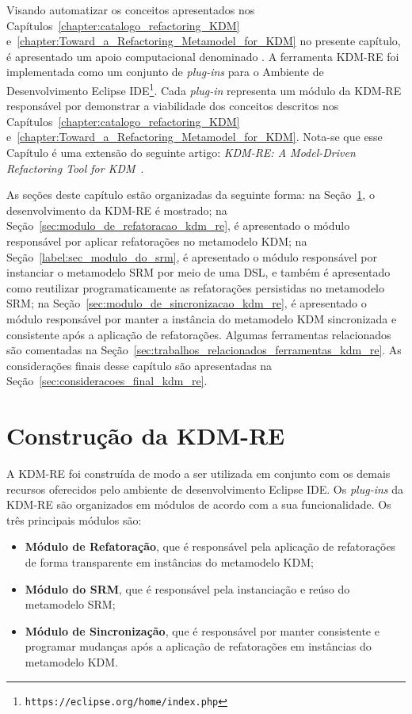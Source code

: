 Visando automatizar os conceitos apresentados nos Capítulos~\ref{chapter:catalogo_refactoring_KDM} e~\ref{chapter:Toward_a_Refactoring_Metamodel_for_KDM} no presente capítulo, é apresentado um apoio computacional denominado . A ferramenta KDM-RE foi implementada como um conjunto de \textit{plug-ins} para o Ambiente de Desenvolvimento Eclipse IDE\footnote{\texttt{https://eclipse.org/home/index.php}}. Cada \textit{plug-in} representa um módulo da KDM-RE responsável por demonstrar a viabilidade dos conceitos descritos nos Capítulos~\ref{chapter:catalogo_refactoring_KDM} e~\ref{chapter:Toward_a_Refactoring_Metamodel_for_KDM}.  Nota-se que esse Capítulo é uma extensão do seguinte artigo: \textit{KDM-RE: A Model-Driven Refactoring Tool for KDM}~\cite{durelli_VEM_ferramenta}.


As seções deste capítulo estão organizadas da seguinte forma: na Seção~\ref{sec:construcao_da_kdm_re}, o desenvolvimento da KDM-RE é mostrado; na Seção~\ref{sec:modulo_de_refatoracao_kdm_re}, é apresentado o módulo responsável por aplicar refatorações no metamodelo KDM; na Seção~\ref{label:sec_modulo_do_srm}, é apresentado o módulo responsável por instanciar o metamodelo SRM por meio de uma DSL, e também é apresentado como reutilizar programaticamente as refatorações persistidas no metamodelo SRM; na Seção~\ref{sec:modulo_de_sincronizacao_kdm_re}, é apresentado o módulo responsável por manter a instância do metamodelo KDM sincronizada e consistente após a aplicação de refatorações. Algumas ferramentas relacionados são comentadas na Seção~\ref{sec:trabalhos_relacionados_ferramentas_kdm_re}. As considerações finais desse capítulo são apresentadas na Seção~\ref{sec:consideracoes_final_kdm_re}.

\section{Construção da KDM-RE}\label{sec:construcao_da_kdm_re}

A KDM-RE foi construída de modo a ser utilizada em conjunto com os demais recursos oferecidos pelo ambiente de desenvolvimento Eclipse IDE. Os \textit{plug-ins} da KDM-RE são organizados em módulos de acordo com a sua funcionalidade. Os três principais módulos são:

\begin{itemize}
\item \textbf{Módulo de Refatoração}, que é responsável pela aplicação de refatorações de forma transparente em instâncias do metamodelo KDM;

\item \textbf{Módulo do SRM}, que é responsável pela instanciação e reúso do metamodelo SRM;

\item \textbf{Módulo de Sincronização}, que é responsável por manter consistente e programar mudanças após a aplicação de refatorações em instâncias do metamodelo KDM.

\end{itemize}

